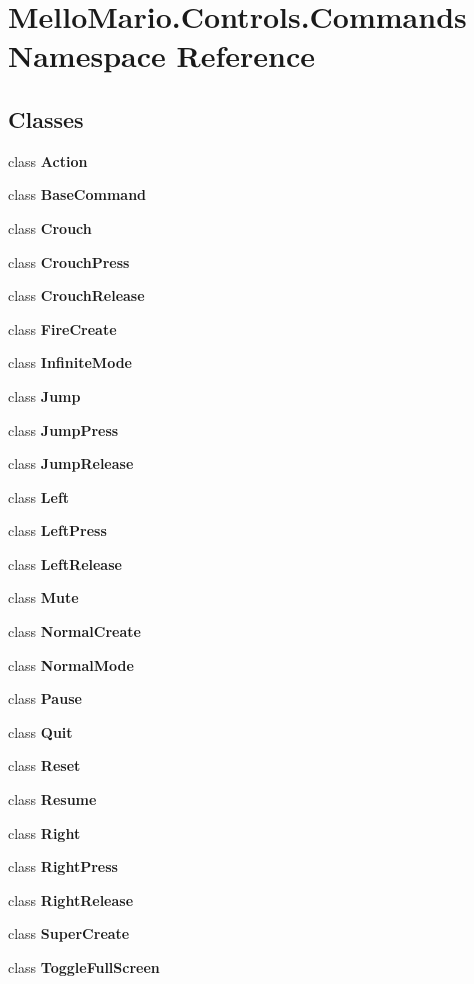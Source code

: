 \section{Mello\+Mario.\+Controls.\+Commands Namespace Reference}
\label{namespaceMelloMario_1_1Controls_1_1Commands}
\subsection*{Classes}
\begin{DoxyCompactItemize}
\item 
class \textbf{ Action}
\item 
class \textbf{ Base\+Command}
\item 
class \textbf{ Crouch}
\item 
class \textbf{ Crouch\+Press}
\item 
class \textbf{ Crouch\+Release}
\item 
class \textbf{ Fire\+Create}
\item 
class \textbf{ Infinite\+Mode}
\item 
class \textbf{ Jump}
\item 
class \textbf{ Jump\+Press}
\item 
class \textbf{ Jump\+Release}
\item 
class \textbf{ Left}
\item 
class \textbf{ Left\+Press}
\item 
class \textbf{ Left\+Release}
\item 
class \textbf{ Mute}
\item 
class \textbf{ Normal\+Create}
\item 
class \textbf{ Normal\+Mode}
\item 
class \textbf{ Pause}
\item 
class \textbf{ Quit}
\item 
class \textbf{ Reset}
\item 
class \textbf{ Resume}
\item 
class \textbf{ Right}
\item 
class \textbf{ Right\+Press}
\item 
class \textbf{ Right\+Release}
\item 
class \textbf{ Super\+Create}
\item 
class \textbf{ Toggle\+Full\+Screen}
\end{DoxyCompactItemize}
